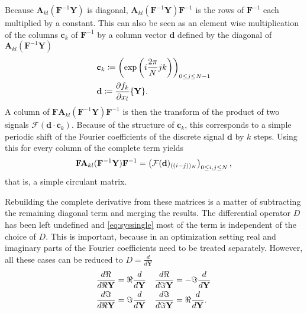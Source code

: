 Because $\mathbf A_{kl}(\mathbf{F}^{-1} \mathbf{Y})$ is diagonal, $\mathbf A_{kl}(\mathbf{F}^{-1} \mathbf{Y}) \mathbf{F}^{-1}$ is the rows of $\mathbf F^{-1}$ each multiplied by a constant.
This can also be seen as an element wise multiplication of the columns $\mathbf c_k$ of $\mathbf F^{-1}$ by a column vector $\mathbf d$ defined by the diagonal of $\mathbf A_{kl}(\mathbf{F}^{-1} \mathbf{Y})$
	\begin{align*}
		&\mathbf c_k \coloneqq \left(\exp\left(i\frac{2\pi}{N} j k\right)\right)_{0 \le j \le N-1}\\
		&\mathbf d \coloneqq \frac{\partial f_k}{\partial x_l} \{\mathbf Y\} \text.
	\end{align*}
A column of $\mathbf{F} \mathbf A_{kl}(\mathbf{F}^{-1} \mathbf{Y}) \mathbf{F}^{-1}$ is then the transform of the product of two signals $\mathcal F(\mathbf d \cdot \mathbf c_k)$.
Because of the structure of $\mathbf c_k$, this corresponds to a simple periodic shift of the Fourier coefficients of the discrete signal $\mathbf d$ by $k$ steps.
Using this for every column of the complete term yields
	\[
			\mathbf{F} \mathbf A_{kl}(\mathbf{F}^{-1} \mathbf{Y}) \mathbf{F}^{-1} = \left( \mathbf {\mathcal{F}}(\mathbf d)_{((i-j))_N} \right)_{0 \le i,j \le N} \text,
	\]
that is, a simple circulant matrix.

Rebuilding the complete derivative from these matrices is a matter of subtracting the remaining diagonal term and merging the results.
The differential operator $D$ has been left undefined and \autoref{eq:syssingle} most of the term is independent of the choice of $D$.
This is important, because in an optimization setting real and imaginary parts of the Fourier coefficients need to be treated separately.
However, all these cases can be reduced to $D = \frac{d}{d \mathbf Y}$
\begin{align*}
	\frac{d \Re}{d\Re \mathbf Y} = \Re \frac{d}{d \mathbf Y} &&& \frac{d \Re}{d\Im \mathbf Y} = -\Im \frac{d}{d \mathbf Y}\\
	\frac{d \Im}{d\Re \mathbf Y} = \Im \frac{d}{d \mathbf Y} &&& \frac{d \Im}{d\Im \mathbf Y} = \Re \frac{d}{d \mathbf Y} \text.
\end{align*}
